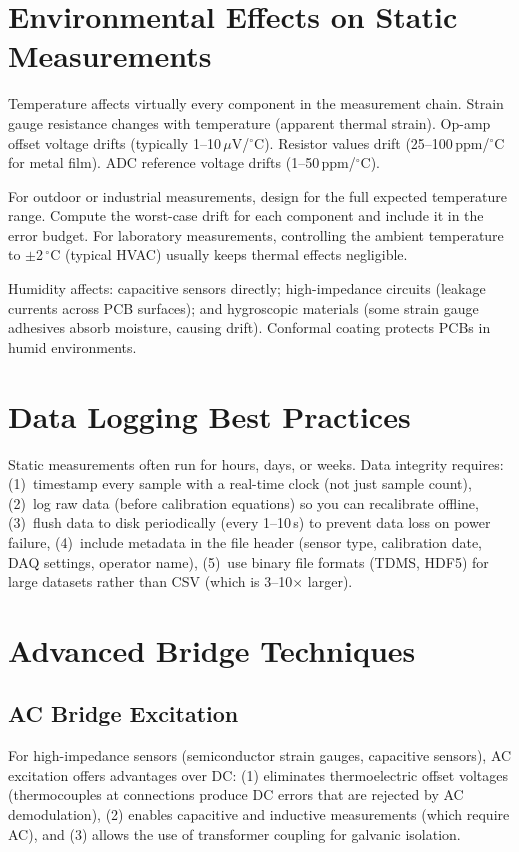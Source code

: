 \documentclass[11pt,letterpaper,twoside,openany]{book}
\newcommand{\degC}{\ensuremath{{}^{\circ}\text{C}}}
\begin{document}
\section{Environmental Effects on Static Measurements}
Temperature affects virtually every component in the measurement chain. Strain gauge resistance changes with temperature (apparent thermal strain). Op-amp offset voltage drifts (typically 1--10\,$\mu$V/\degC{}). Resistor values drift (25--100\,ppm/\degC{} for metal film). ADC reference voltage drifts (1--50\,ppm/\degC{}).

For outdoor or industrial measurements, design for the full expected temperature range. Compute the worst-case drift for each component and include it in the error budget. For laboratory measurements, controlling the ambient temperature to $\pm$2\,\degC{} (typical HVAC) usually keeps thermal effects negligible.

Humidity affects: capacitive sensors directly; high-impedance circuits (leakage currents across PCB surfaces); and hygroscopic materials (some strain gauge adhesives absorb moisture, causing drift). Conformal coating protects PCBs in humid environments.

\section{Data Logging Best Practices}
Static measurements often run for hours, days, or weeks. Data integrity requires: (1)~timestamp every sample with a real-time clock (not just sample count), (2)~log raw data (before calibration equations) so you can recalibrate offline, (3)~flush data to disk periodically (every 1--10\,s) to prevent data loss on power failure, (4)~include metadata in the file header (sensor type, calibration date, DAQ settings, operator name), (5)~use binary file formats (TDMS, HDF5) for large datasets rather than CSV (which is 3--10$\times$ larger).
\section{Advanced Bridge Techniques}
\subsection{AC Bridge Excitation}
For high-impedance sensors (semiconductor strain gauges, capacitive sensors), AC excitation offers advantages over DC: (1) eliminates thermoelectric offset voltages (thermocouples at connections produce DC errors that are rejected by AC demodulation), (2) enables capacitive and inductive measurements (which require AC), and (3) allows the use of transformer coupling for galvanic isolation.
\end{document}
